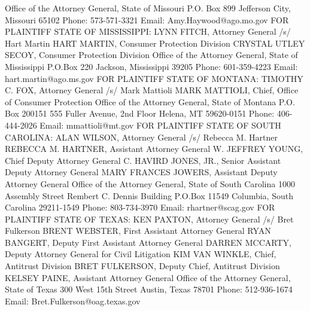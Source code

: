 \documentclass[11pt,b5paper]{scrartcl}
\begin{document}
Office of the Attorney General, State of Missouri
P.O. Box 899
Jefferson City, Missouri 65102
Phone: 573-571-3321
Email: Amy.Haywood@ago.mo.gov
FOR PLAINTIFF STATE OF MISSISSIPPI:
LYNN FITCH, Attorney General
/s/ Hart Martin
HART MARTIN, Consumer Protection Division
CRYSTAL UTLEY SECOY, Consumer Protection Division
Office of the Attorney General, State of Mississippi
P.O.Box 220
Jackson, Mississippi 39205
Phone: 601-359-4223
Email: hart.martin@ago.ms.gov
FOR PLAINTIFF STATE OF MONTANA:
TIMOTHY C. FOX, Attorney General
/s/ Mark Mattioli
MARK MATTIOLI, Chief, Office of Consumer Protection
Office of the Attorney General, State of Montana
P.O. Box 200151
555 Fuller Avenue, 2nd Floor
Helena, MT 59620-0151
Phone: 406-444-2026
Email: mmattioli@mt.gov
FOR PLAINTIFF STATE OF SOUTH CAROLINA:
ALAN WILSON, Attorney General
/s/ Rebecca M. Hartner
REBECCA M. HARTNER, Assistant Attorney General
W. JEFFREY YOUNG, Chief Deputy Attorney General
C. HAVIRD JONES, JR., Senior Assistant Deputy Attorney General
MARY FRANCES JOWERS, Assistant Deputy Attorney General
Office of the Attorney General, State of South Carolina
1000 Assembly Street
Rembert C. Dennis Building
P.O.Box 11549
Columbia, South Carolina 29211-1549
Phone: 803-734-3970
Email: rhartner@scag.gov
FOR PLAINTIFF STATE OF TEXAS:
KEN PAXTON, Attorney General
/s/ Bret Fulkerson
BRENT WEBSTER, First Assistant Attorney General
RYAN BANGERT, Deputy First Assistant Attorney General
DARREN MCCARTY, Deputy Attorney General for Civil Litigation
KIM VAN WINKLE, Chief, Antitrust Division
BRET FULKERSON, Deputy Chief, Antitrust Division
KELSEY PAINE, Assistant Attorney General
Office of the Attorney General, State of Texas
300 West 15th Street
Austin, Texas 78701
Phone: 512-936-1674
Email: Bret.Fulkerson@oag.texas.gov
\end{document}

